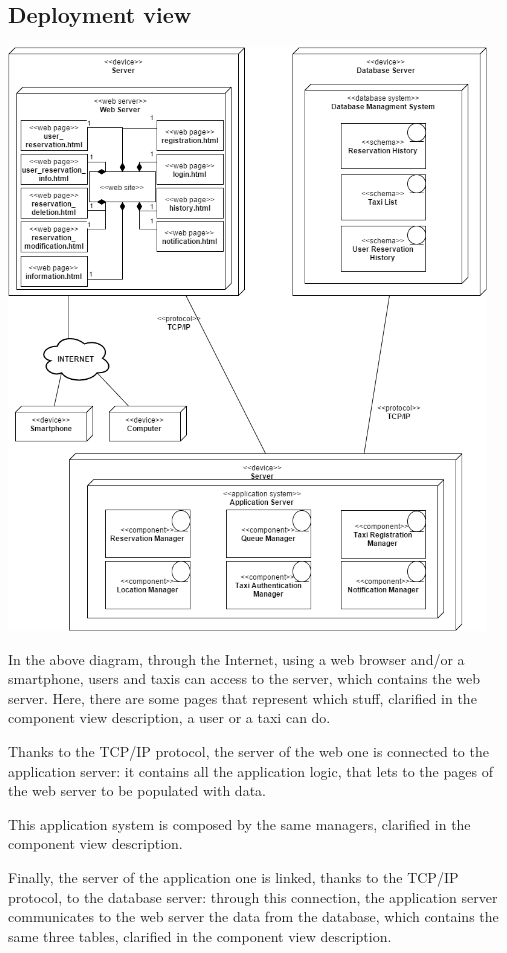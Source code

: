 \subsection{Deployment view}
	\begin{center}
		\includegraphics[width=0.95\textwidth]{./images/deployment_view.png}
	\end{center}
	
	In the above diagram, through the Internet, using a web browser and/or a smartphone, users and taxis can access to the server, which contains the web server. Here, there are some pages that represent which stuff, clarified in the component view description, a user or a taxi can do.
	
	Thanks to the TCP/IP protocol, the server of the web one is connected to the application server: it contains all the application logic, that lets to the pages of the web server to be populated with data.
	
	This application system is composed by the same managers, clarified in the component view description.
	
	Finally, the server of the application one is linked, thanks to the TCP/IP protocol, to the database server: through this connection, the application server communicates to the web server the data from the database, which contains the same three tables, clarified in the component view description. 


